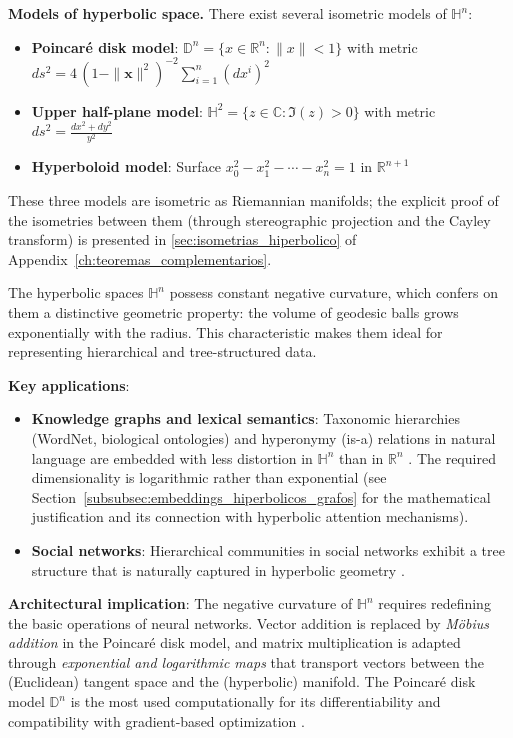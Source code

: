 \textbf{Models of hyperbolic space.}\label{rem:modelos_hiperbolico} There exist several isometric models of $\mathbb{H}^n$:
\begin{itemize}
    \item \textbf{Poincaré disk model}: $\mathbb{D}^n = \{x \in \mathbb{R}^n : \|x\| < 1\}$
          with metric $ds^2 = 4\,(1 - \|\mathbf{x}\|^2)^{-2} \sum_{i=1}^n (dx^i)^2$
    \item \textbf{Upper half-plane model}: $\mathbb{H}^2 = \{z \in \mathbb{C} : \Im(z) > 0\}$
          with metric $ds^2 = \frac{dx^2 + dy^2}{y^2}$
    \item \textbf{Hyperboloid model}: Surface $x_0^2 - x_1^2 - \cdots - x_n^2 = 1$ in $\mathbb{R}^{n+1}$
\end{itemize}

These three models are isometric as Riemannian manifolds; the explicit proof of the isometries between them (through stereographic projection and the Cayley transform) is presented in \autoref{sec:isometrias_hiperbolico} of Appendix~\ref{ch:teoremas_complementarios}.

The hyperbolic spaces $\mathbb{H}^n$ possess constant negative curvature, which confers on them a distinctive geometric property: the volume of geodesic balls grows exponentially with the radius. This characteristic makes them ideal for representing hierarchical and tree-structured data.

\textbf{Key applications}:
\begin{itemize}
    \item \textbf{Knowledge graphs and lexical semantics}: Taxonomic hierarchies (WordNet, biological ontologies) and hyperonymy (is-a) relations in natural language are embedded with less distortion in $\mathbb{H}^n$ than in $\mathbb{R}^n$ \citep{nickel2017poincare}. The required dimensionality is logarithmic rather than exponential (see Section~\ref{subsubsec:embeddings_hiperbolicos_grafos} for the mathematical justification and its connection with hyperbolic attention mechanisms).

    \item \textbf{Social networks}: Hierarchical communities in social networks exhibit a tree structure that is naturally captured in hyperbolic geometry \citep{krioukov2010hyperbolic}.
\end{itemize}

\textbf{Architectural implication}: The negative curvature of $\mathbb{H}^n$ requires redefining the basic operations of neural networks. Vector addition is replaced by \textit{Möbius addition} in the Poincaré disk model, and matrix multiplication is adapted through \textit{exponential and logarithmic maps} that transport vectors between the (Euclidean) tangent space and the (hyperbolic) manifold. The Poincaré disk model $\mathbb{D}^n$ is the most used computationally for its differentiability and compatibility with gradient-based optimization \citep{nickel2017poincare}.

